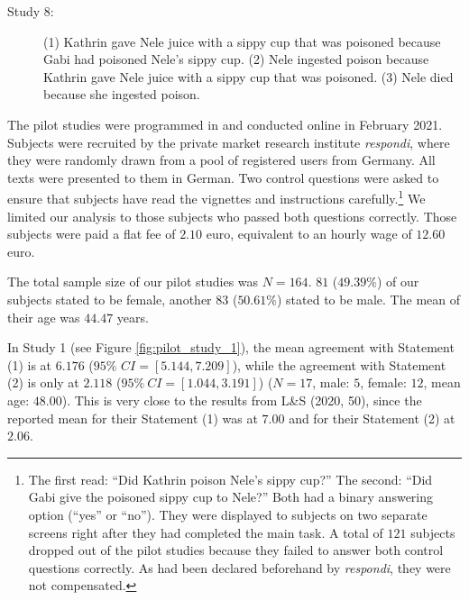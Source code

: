 \documentclass[egregdoesnotlikesansseriftitles,12pt]{scrartcl}
\begin{document}
\begin{description}
   \item [Study 8:] (1) Kathrin gave Nele juice with a sippy cup that was poisoned because Gabi had poisoned Nele's sippy cup. (2) Nele ingested poison because Kathrin gave Nele juice with a sippy cup that was poisoned. (3) Nele died because she ingested poison.%
\end{description}

\noindent The pilot studies were programmed in \citet{limesurvey_limesurvey_2021} and conducted online in February 2021. Subjects were recruited by the private market research institute \textit{respondi}, where they were randomly drawn from a pool of registered users from Germany. All texts were presented to them in German. Two control questions were asked to ensure that subjects have read the vignettes and instructions carefully.\footnote{The first read: ``Did Kathrin poison Nele's sippy cup?'' The second: ``Did Gabi give the poisoned sippy cup to Nele?'' Both had a binary answering option (``yes'' or ``no''). They were displayed to subjects on two separate screens right after they had completed the main task.
A total of $121$ subjects dropped out of the pilot studies because they failed to answer both control questions correctly. As had been declared beforehand by \textit{respondi}, they were not compensated.} We limited our analysis to those subjects who passed both questions correctly. Those subjects were paid a flat fee of $2.10$ euro, equivalent to an hourly wage of $12.60$ euro.

The total sample size of our pilot studies was $N=164$. $81$ ($49.39\%$) of our subjects stated to be female, another $83$ ($50.61\%$) stated to be male. The mean of their age was $44.47$ years.

In Study 1 (see Figure \ref{fig:pilot_study_1}), the mean agreement with Statement (1) is at $6.176$ ($95\%$ $CI=[5.144,7.209]$), while the agreement with Statement (2) is only at $2.118$ ($95\%~CI=[1.044,3.191]$) ($N=17$, male: $5$, female: $12$, mean age: $48.00$). This is very close to the results from L\&S (2020, 50), since the reported mean for their Statement (1) was at $7.00$ and for their Statement (2) at $2.06$.
\end{document}
